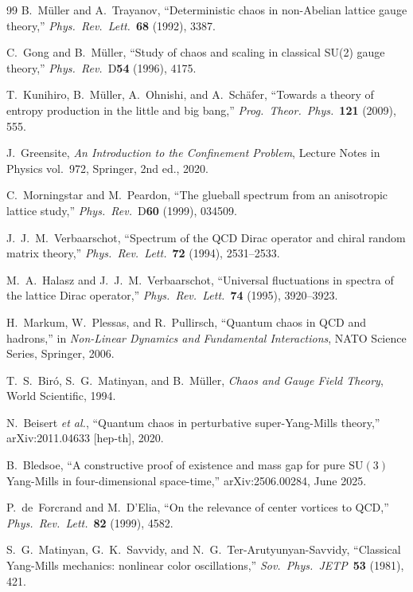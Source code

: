 \documentclass[11pt,a4paper]{article}
\theoremstyle{plain}
\theoremstyle{remark}
\newcommand{\SU}{\mathrm{SU}}
\begin{document}
\begin{thebibliography}{99}
B.~M\"uller and A.~Trayanov,
``Deterministic chaos in non-Abelian lattice gauge theory,''
\textit{Phys.~Rev.~Lett.}~\textbf{68} (1992), 3387.

C.~Gong and B.~M\"uller,
``Study of chaos and scaling in classical SU(2) gauge theory,''
\textit{Phys.~Rev.}~D\textbf{54} (1996), 4175.

T.~Kunihiro, B.~M\"uller, A.~Ohnishi, and A.~Sch\"afer,
``Towards a theory of entropy production in the little and big bang,''
\textit{Prog.~Theor.~Phys.}~\textbf{121} (2009), 555.

J.~Greensite,
\textit{An Introduction to the Confinement Problem},
Lecture Notes in Physics vol.~972, Springer, 2nd ed., 2020.

C.~Morningstar and M.~Peardon,
``The glueball spectrum from an anisotropic lattice study,''
\textit{Phys.~Rev.}~D\textbf{60} (1999), 034509.

J.~J.~M.~Verbaarschot,
``Spectrum of the QCD Dirac operator and chiral random matrix theory,''
\textit{Phys.~Rev.~Lett.}~\textbf{72} (1994), 2531--2533.

M.~A.~Halasz and J.~J.~M.~Verbaarschot,
``Universal fluctuations in spectra of the lattice Dirac operator,''
\textit{Phys.~Rev.~Lett.}~\textbf{74} (1995), 3920--3923.

H.~Markum, W.~Plessas, and R.~Pullirsch,
``Quantum chaos in QCD and hadrons,''
in \textit{Non-Linear Dynamics and Fundamental Interactions},
NATO Science Series, Springer, 2006.

T.~S.~Bir\'o, S.~G.~Matinyan, and B.~M\"uller,
\textit{Chaos and Gauge Field Theory},
World Scientific, 1994.

N.~Beisert \textit{et al.},
``Quantum chaos in perturbative super-Yang-Mills theory,''
arXiv:2011.04633 [hep-th], 2020.

B.~Bledsoe,
``A constructive proof of existence and mass gap for pure $\SU(3)$
Yang-Mills in four-dimensional space-time,''
arXiv:2506.00284, June 2025.

P.~de~Forcrand and M.~D'Elia,
``On the relevance of center vortices to QCD,''
\textit{Phys.~Rev.~Lett.}~\textbf{82} (1999), 4582.

S.~G.~Matinyan, G.~K.~Savvidy, and N.~G.~Ter-Arutyunyan-Savvidy,
``Classical Yang-Mills mechanics: nonlinear color oscillations,''
\textit{Sov.~Phys.~JETP}~\textbf{53} (1981), 421.

\end{thebibliography}
\end{document}
